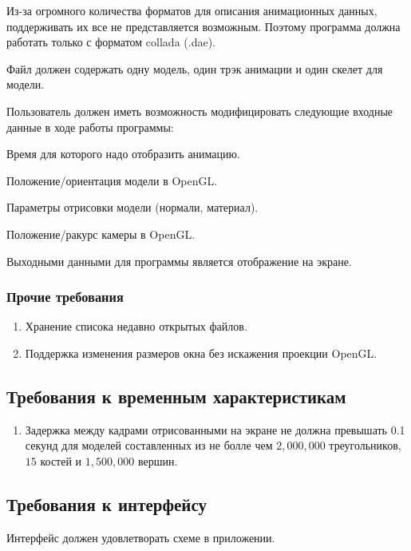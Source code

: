 \begin{my_enumerate}
\item Из-за огромного количества форматов для описания анимационных данных, поддерживать их все не представляется возможным. Поэтому программа должна работать только с форматом collada (.dae).
\item Файл должен содержать одну модель, один трэк анимации и один скелет для модели.
\item Пользователь должен иметь возможность модифицировать следующие входные данные в ходе работы программы:
\begin{my_enumerate}
\item Время для которого надо отобразить анимацию.
\item Положение/ориентация модели в OpenGL.
\item Параметры отрисовки модели (нормали, материал).
\item Положение/ракурс камеры в OpenGL.
\end{my_enumerate}
\end{my_enumerate}

\medskip
Выходными данными для программы является отображение на экране.


\subsubsection{Прочие требования}
\begin{enumerate}
\item Хранение списока недавно открытых файлов.
\item Поддержка изменения размеров окна без искажения проекции OpenGL.
\end{enumerate}

\subsection{Требования к временным характеристикам}
\begin{enumerate}
\item Задержка между кадрами отрисованными на экране не должна превышать 0.1 секунд для моделей составленных из не болле чем $2,000,000$ треугольников, $15$ костей и $1,500,000$ вершин.
\end{enumerate}


\subsection{Требования к интерфейсу}
Интерфейс должен удовлетворать схеме в приложении.

